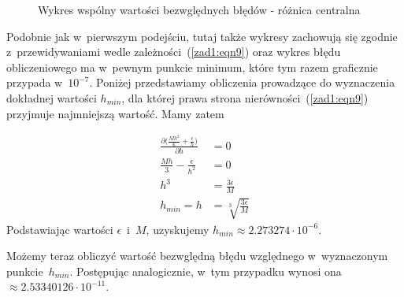 \begin{figure}[h!]
	\caption{Wykres wspólny wartości bezwględnych błędów - różnica centralna}
	\label{zad1:graph2}
\end{figure}

Podobnie jak w~pierwszym podejściu, tutaj także wykresy zachowują się zgodnie z~przewidywaniami wedle zależności~(\ref{zad1:eqn9}) oraz wykres błędu obliczeniowego ma w~pewnym punkcie minimum, które tym razem graficznie przypada w~$10^{-7}$. Poniżej przedstawiamy obliczenia prowadzące do wyznaczenia dokładnej wartości $h_{min}$, dla której prawa strona nierówności~(\ref{zad1:eqn9}) przyjmuje najmniejszą wartość. Mamy zatem

\begin{align}
	\frac{\partial{(\frac{Mh^2}{6}+\frac{\epsilon}{h}})}{\partial{h}} &= 0 \\
	\frac{Mh}{3}-\frac{\epsilon}{h^2} &= 0 \\
	h^3 &= \frac{3\epsilon}{M} \\ 
	h_{min} = h &= \sqrt[3]{\frac{3\epsilon}{M}}
\end{align}
Podstawiając wartości $\epsilon$~i~$M$, uzyskujemy $h_{min} \approx 2.273274 \cdot 10^{-6}$.

Możemy teraz obliczyć wartość bezwględną błędu względnego w~wyznaczonym punkcie~$h_{min}$. Postępując analogicznie, w~tym przypadku wynosi ona $\approx 2.53340126 \cdot 10^{-11}$.

\newpage
